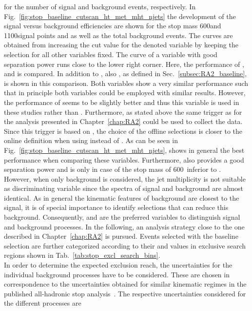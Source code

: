 for the number of signal and background events, respectively. In Fig.~\ref{fig:stop_baseline_cutscan_ht_met_mht_njets} the development of the signal versus background efficiencies are shown for the stop mass 600\gev and 1100\gev signal points and \ttbar as well as the total background events. The curves are obtained from increasing the cut value for the denoted variable by keeping the selection for all other variables fixed. The curve of a variable with good separation power runs close to the lower right corner. Here, the performance of \HT, \met and \NJets is compared. In addition to \met, also \MHT, as defined in Sec.~\ref{subsec:RA2_baseline}, is shown in this comparison. Both variables show a very similar performance such that in principle both variables could be employed with similar results. However, the performance of \met seems to be slightly better and thus this variable is used in these studies rather than \MHT. Furthermore, as stated above the same trigger as for the analysis presented in Chapter~\ref{chap:RA2} could be used to collect the data. Since this trigger is based on \met, the choice of the offline selections is closer to the online definition when using \met instead of \MHT. As can be seen in Fig.~\ref{fig:stop_baseline_cutscan_ht_met_mht_njets}, \met shows in general the best performance when comparing these variables. Furthermore, also \HT provides a good separation power and is only in case of the stop mass of 600~\gev inferior to \NJets. However, when only \ttbar background is considered, the jet multiplicity is not suitable as discriminating variable since the \NJets spectra of signal and \ttbar background are almost identical. As in general the kinematic features of \ttbar background are closest to the signal, it is of special importance to identify selections that can reduce this background. Consequently, \met and \HT are the preferred variables to distinguish signal and background processes. In the following, an analysis strategy close to the one described in Chapter~\ref{chap:RA2} is pursued. Events selected with the baseline selection are further categorized according to their \HT and \met values in exclusive search regions shown in Tab.~\ref{tab:stop_excl_search_bins}. \\ 
In order to determine the expected exclusion reach, the uncertainties for the individual background processes have to be considered. These are chosen in correspondence to the uncertainties obtained for similar kinematic regimes in the published all-hadronic stop analysis~\cite{CMS-PAS-SUS-13-015}. The respective uncertainties considered for the different processes are

